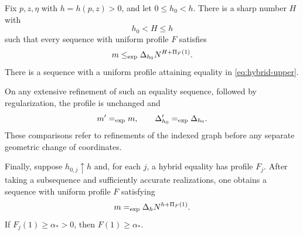\begin{lemma}\label{lem:hybrid-equality}
Fix $p,z,\eta$ with $h=h(p,z)>0$, and let $0\le h_0<h$.
There is a sharp number $H$ with
\[
 h_0<H\le h
\]
such that every sequence with uniform profile $F$ satisfies
\begin{equation}\label{eq:hybrid-upper}
 m\mathrel{\leq_{\mathrm{exp}}} \Delta_{h_0}N^{H+\Pi_F(1)}.
\end{equation}
There is a sequence with a uniform profile attaining equality in
\eqref{eq:hybrid-upper}.

On any extensive refinement of such an equality sequence, followed by
regularization, the profile is unchanged and
\begin{equation}\label{eq:equality-refinement}
 m'\mathrel{=_{\mathrm{exp}}} m,\qquad \Delta'_{h_0}\mathrel{=_{\mathrm{exp}}}\Delta_{h_0}.
\end{equation}
These comparisons refer to refinements of the indexed graph before any
separate geometric change of coordinates.

Finally, suppose $h_{0,j}\uparrow h$ and, for each $j$, a hybrid equality
has profile $F_j$.  After taking a subsequence and sufficiently accurate
realizations, one obtains a sequence with uniform profile $F$ satisfying
\begin{equation}\label{eq:exact-critical-equality}
 m\mathrel{=_{\mathrm{exp}}}\Delta_hN^{h+\Pi_F(1)}.
\end{equation}
If $F_j(1)\ge\alpha_*>0$, then $F(1)\ge\alpha_*$.
\end{lemma}

